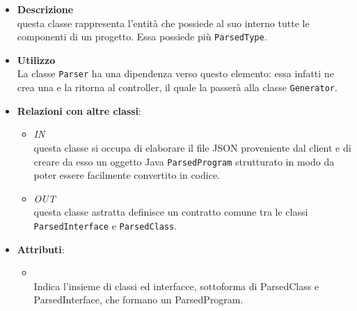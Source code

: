 \label{\nogloxy{swedesigner::server::project::ParsedProgram}}
\begin{figure}[h]
\centering
{}
\caption{}
\end{figure}
\FloatBarrier
\begin{itemize}
\item \textbf{Descrizione}\\
questa classe rappresenta l'entità che possiede al suo interno tutte le componenti di un progetto. Essa possiede più \texttt{ParsedType}.
\item \textbf{Utilizzo}\\
La classe \texttt{Parser} ha una dipendenza verso questo elemento: essa infatti ne crea una e la ritorna al controller, il quale la passerà alla classe \texttt{Generator}.
\item \textbf{Relazioni con altre classi}:
\begin{itemize}
\item \textit{IN} \hyperref[\nogloxy{swedesigner::server::parser::Parser}]{}\\
questa classe si occupa di elaborare il file JSON proveniente dal client e di creare da esso un oggetto Java \texttt{ParsedProgram} strutturato in modo da poter essere facilmente convertito in codice.
\item \textit{OUT} \hyperref[\nogloxy{swedesigner::server::project::ParsedType}]{}\\
questa classe astratta definisce un contratto comune tra le classi \texttt{ParsedInterface} e \texttt{ParsedClass}. 
\end{itemize}
\item \textbf{Attributi}:
\begin{itemize}
\item {}
\\ Indica l'insieme di classi ed interfacce, sottoforma di ParsedClass e ParsedInterface, che formano un ParsedProgram.
\end{itemize}

\end{itemize}

